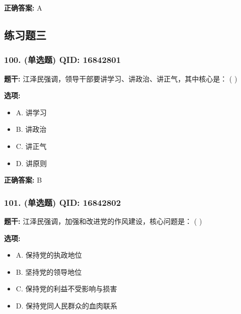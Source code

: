 \documentclass[12pt,UTF8]{ctexart}
\begin{document}
\textbf{正确答案:}
A

\vspace{0.3em}\hrulefill\vspace{0.7em}

\subsection*{练习题三}

\subsubsection*{100. (单选题) \small QID: 16842801}

\textbf{题干:}
江泽民强调，领导干部要讲学习、讲政治、讲正气，其中核心是： ( )

\textbf{选项:}
\begin{itemize}[leftmargin=*]

  \item A. 讲学习

  \item B. 讲政治

  \item C. 讲正气

  \item D. 讲原则

\end{itemize}

\textbf{正确答案:}
B

\vspace{0.3em}\hrulefill\vspace{0.7em}

\subsubsection*{101. (单选题) \small QID: 16842802}

\textbf{题干:}
江泽民强调，加强和改进党的作风建设，核心问题是： ( )

\textbf{选项:}
\begin{itemize}[leftmargin=*]

  \item A. 保持党的执政地位

  \item B. 坚持党的领导地位

  \item C. 保持党的利益不受影响与损害

  \item D. 保持党同人民群众的血肉联系

\end{itemize}
\end{document}
